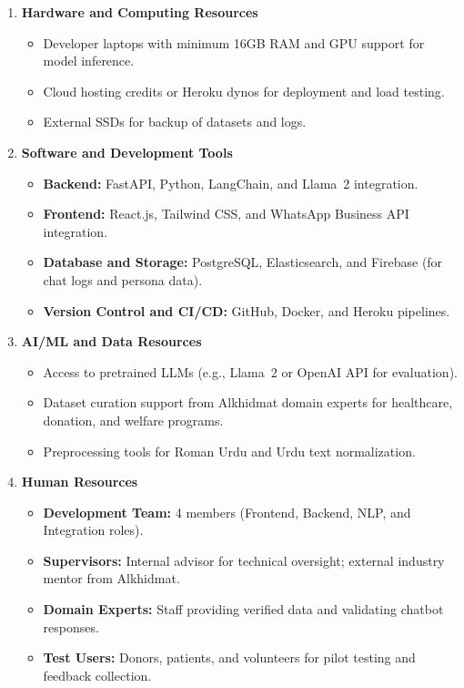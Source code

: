 \begin{enumerate}
    \item \textbf{Hardware and Computing Resources}
    \begin{itemize}
        \item Developer laptops with minimum 16GB RAM and GPU support for model inference.
        \item Cloud hosting credits or Heroku dynos for deployment and load testing.
        \item External SSDs for backup of datasets and logs.
    \end{itemize}

    \item \textbf{Software and Development Tools}
    \begin{itemize}
        \item \textbf{Backend:} FastAPI, Python, LangChain, and Llama~2 integration.
        \item \textbf{Frontend:} React.js, Tailwind CSS, and WhatsApp Business API integration.
        \item \textbf{Database and Storage:} PostgreSQL, Elasticsearch, and Firebase (for chat logs and persona data).
        \item \textbf{Version Control and CI/CD:} GitHub, Docker, and Heroku pipelines.
    \end{itemize}

    \item \textbf{AI/ML and Data Resources}
    \begin{itemize}
        \item Access to pretrained LLMs (e.g., Llama~2 or OpenAI API for evaluation).
        \item Dataset curation support from Alkhidmat domain experts for healthcare, donation, and welfare programs.
        \item Preprocessing tools for Roman Urdu and Urdu text normalization.
    \end{itemize}

    \item \textbf{Human Resources}
    \begin{itemize}
        \item \textbf{Development Team:} 4 members (Frontend, Backend, NLP, and Integration roles).
        \item \textbf{Supervisors:} Internal advisor for technical oversight; external industry mentor from Alkhidmat.
        \item \textbf{Domain Experts:} Staff providing verified data and validating chatbot responses.
        \item \textbf{Test Users:} Donors, patients, and volunteers for pilot testing and feedback collection.
    \end{itemize}


\end{enumerate}
